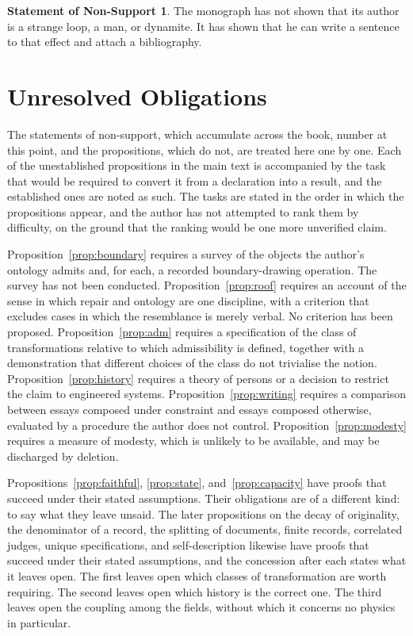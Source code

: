 \documentclass[11pt,openany,twoside]{book}
\theoremstyle{plain}
\theoremstyle{definition}
\newtheorem{nonsupport}{Statement of Non-Support}
\theoremstyle{remark}
\begin{document}
\begin{nonsupport}
The monograph has not shown that its author is a strange loop, a man, or dynamite. It has shown that he can write a sentence to that effect and attach a bibliography.
\end{nonsupport}

\appendix
\chapter{Unresolved Obligations}

The statements of non-support, which accumulate across the book, number \thenonsupport{} at this point, and the propositions, which do not, are treated here one by one. Each of the unestablished propositions in the main text is accompanied by the task that would be required to convert it from a declaration into a result, and the established ones are noted as such. The tasks are stated in the order in which the propositions appear, and the author has not attempted to rank them by difficulty, on the ground that the ranking would be one more unverified claim.

Proposition~\ref{prop:boundary} requires a survey of the objects the author's ontology admits and, for each, a recorded boundary-drawing operation. The survey has not been conducted. Proposition~\ref{prop:roof} requires an account of the sense in which repair and ontology are one discipline, with a criterion that excludes cases in which the resemblance is merely verbal. No criterion has been proposed. Proposition~\ref{prop:adm} requires a specification of the class of transformations relative to which admissibility is defined, together with a demonstration that different choices of the class do not trivialise the notion. Proposition~\ref{prop:history} requires a theory of persons or a decision to restrict the claim to engineered systems. Proposition~\ref{prop:writing} requires a comparison between essays composed under constraint and essays composed otherwise, evaluated by a procedure the author does not control. Proposition~\ref{prop:modesty} requires a measure of modesty, which is unlikely to be available, and may be discharged by deletion.

Propositions~\ref{prop:faithful}, \ref{prop:state}, and~\ref{prop:capacity} have proofs that succeed under their stated assumptions. Their obligations are of a different kind: to say what they leave unsaid. The later propositions on the decay of originality, the denominator of a record, the splitting of documents, finite records, correlated judges, unique specifications, and self-description likewise have proofs that succeed under their stated assumptions, and the concession after each states what it leaves open. The first leaves open which classes of transformation are worth requiring. The second leaves open which history is the correct one. The third leaves open the coupling among the fields, without which it concerns no physics in particular.
\end{document}
